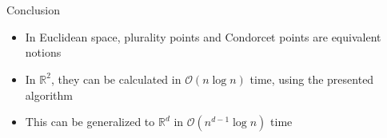 \documentclass{beamer}
\newcommand{\RR}{\mathbb{R}}
\begin{document}
\section*{}
\begin{frame}{Conclusion}
  \begin{itemize}
  \item In Euclidean space, plurality points and Condorcet points are equivalent notions
  \item In \(\RR^2\), they can be calculated in \(\mathcal{O}(n \log n)\) time, using the presented
    algorithm
  \item This can be generalized to \(\RR^d\) in \(\mathcal{O}(n^{d-1} \log n)\) time
  \end{itemize}
\end{frame}
\end{document}
